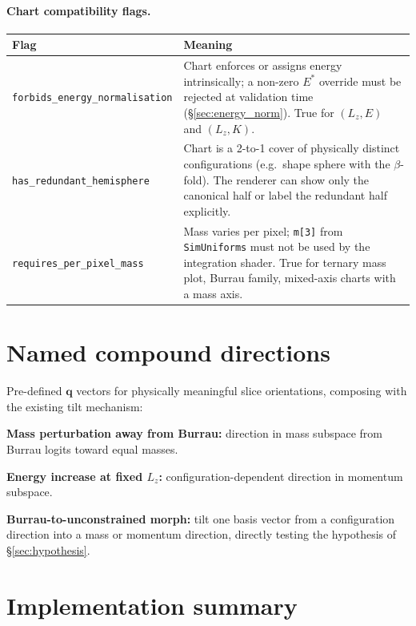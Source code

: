 \documentclass[11pt]{report}
\begin{document}
\paragraph{Chart compatibility flags.}
\begin{center}
\begin{tabular}{lp{10cm}}
\toprule
Flag & Meaning \\
\midrule
\texttt{forbids\_energy\_normalisation} & Chart enforces or assigns energy intrinsically; a non-zero $E^*$ override must be rejected at validation time (\S\ref{sec:energy_norm}). True for $(L_z,E)$ and $(L_z,K)$. \\
\texttt{has\_redundant\_hemisphere} & Chart is a 2-to-1 cover of physically distinct configurations (e.g.\ shape sphere with the $\beta$-fold). The renderer can show only the canonical half or label the redundant half explicitly. \\
\texttt{requires\_per\_pixel\_mass} & Mass varies per pixel; \texttt{m[3]} from \texttt{SimUniforms} must not be used by the integration shader. True for ternary mass plot, Burrau family, mixed-axis charts with a mass axis. \\
\bottomrule
\end{tabular}
\end{center}

\section{Named compound directions}
\label{sec:named_directions}

Pre-defined $\mathbf q$ vectors for physically meaningful slice orientations, composing with the existing tilt mechanism:

\textbf{Mass perturbation away from Burrau:} direction in mass subspace from Burrau logits toward equal masses.

\textbf{Energy increase at fixed $L_z$:} configuration-dependent direction in momentum subspace.

\textbf{Burrau-to-unconstrained morph:} tilt one basis vector from a configuration direction into a mass or momentum direction, directly testing the hypothesis of \S\ref{sec:hypothesis}.

\section{Implementation summary}
\label{sec:interaction_summary}
\end{document}
